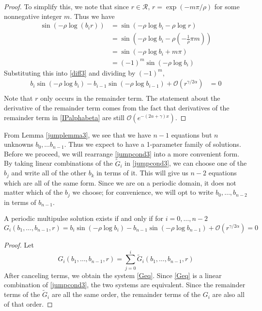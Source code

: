 \documentclass[thesis.tex]{subfiles}
\begin{document}
\begin{lemma}
\begin{proof}
To simplify this, we note that since $r \in \mathcal{R}$, $r = \exp(-m \pi / \rho)$ for some nonnegative integer $m$. Thus we have
\begin{align*}
\sin \left( -\rho \log (b_i r) \right)
&= \sin \left( -\rho \log b_i - \rho \log r  \right) \\
&= \sin \left( -\rho \log b_i - \rho \left( -\frac{1}{\rho}\pi m \right) \right) \\
&= \sin \left( -\rho \log b_i + m \pi \right) \\
&= (-1)^m \sin \left( -\rho \log b_i \right) 
\end{align*}
Substituting this into \eqref{diff3} and dividing by $(-1)^m$, 
\begin{align*}
b_i \sin \left( -\rho \log b_i \right) - b_{i-1} \sin \left( -\rho \log b_{i-1} \right) + \mathcal{O}(r^{\gamma / 2 \alpha}) &= 0 \\
\end{align*}
Note that $r$ only occurs in the remainder term. The statement about the derivative of the remainder term comes from the fact that derivatives of the remainder term in \eqref{IPalphabeta} are still $\mathcal{O}(e^{-(2 \alpha + \gamma) x})$.
\end{proof}
\end{lemma}

From Lemma \ref{jumplemma3}, we see that we have $n-1$ equations but $n$ unknowns $b_0, \dots b_{n-1}$. Thus we expect to have a 1-parameter family of solutions. Before we proceed, we will rearrange \eqref{jumpcond3} into a more convenient form. By taking linear combinations of the $\tilde{G}_i$ in \eqref{jumpcond3}, we can choose one of the $b_j$ and write all of the other $b_k$ in terms of it. This will give us $n-2$ equations which are all of the same form. Since we are on a periodic domain, it does not matter which of the $b_j$ we choose; for convenience, we will opt to write $b_0, \dots, b_{n-2}$ in terms of $b_{n-1}$.


\begin{lemma}\label{diagonalG}
A periodic multipulse solution exists if and only if for $i = 0, \dots, n-2$
\begin{equation}\label{Geq}
G_i(b_1, \dots, b_{n-1}, r) = b_i \sin \left( -\rho \log b_i \right) - b_{n-1} \sin \left( -\rho \log b_{n-1} \right) + \mathcal{O}(r^{\gamma / 2 \alpha}) = 0
\end{equation}

\begin{proof}
Let \begin{equation}\label{Gidef}
G_i(b_1, \dots, b_{n-1}, r) = \sum_{j = 0}^i \tilde{G}_i(b_1, \dots, b_{n-1}, r)
\end{equation}
After canceling terms, we obtain the system \eqref{Geq}. Since \eqref{Geq} is a linear combination of \eqref{jumpcond3}, the two systems are equivalent. Since the remainder terms of the $\tilde{G}_i$ are all the same order, the remainder terms of the $G_i$ are also all of that order.
\end{proof}
\end{lemma}
\end{document}
